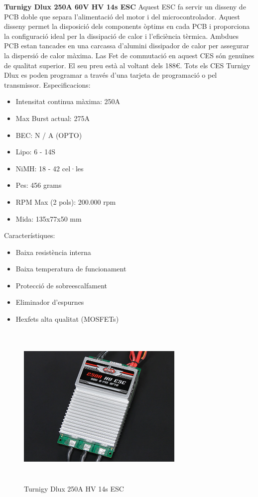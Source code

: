 \textbf{Turnigy Dlux 250A 60V HV 14s ESC}\bigskip \newline  
Aquest ESC fa servir un disseny de PCB doble que separa l'alimentació del motor i del microcontrolador. Aquest disseny permet la disposició dels components òptims en cada PCB i proporciona la configuració ideal per la dissipació de calor i l'eficiència tèrmica. Ambdues PCB estan tancades en una carcassa d'alumini dissipador de calor per assegurar la dispersió de calor màxima. Las Fet de commutació en aquest CES són genuïnes de qualitat superior. El seu preu està al voltant dels 188€.
Tots els CES Turnigy Dlux es poden programar a través d'una tarjeta de programació o pel transmissor. \newline \bigskip 
Especificacions:
	\begin{itemize}
            \item Intensitat continua màxima: 250A
            \item Max Burst actual: 275A
            \item BEC: N / A (OPTO)
            \item Lipo: 6 - 14S
            \item NiMH: 18 - 42 cel·les
            \item Pes: 456 grams
            \item RPM Max (2 pols): 200.000 rpm
            \item Mida: 135x77x50 mm
	\end{itemize}
Característiques:
	\begin{itemize}
			\item Baixa resistència interna
			\item Baixa temperatura de funcionament
			\item Protecció de sobreescalfament
			\item Eliminador d'espurnes
			\item Hexfets alta qualitat (MOSFETs)
	\end{itemize}
\begin{figure}[H]
		\centering
   	\includegraphics[width=8cm, height=8cm]{Marcteoric/250Hobydriver.jpg}
     	\caption{Turnigy Dlux 250A HV 14s ESC} 
\end{figure}
